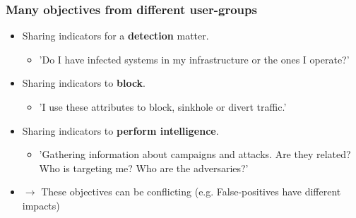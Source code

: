 \begin{frame}
\frametitle{Many objectives from different user-groups}
        \begin{itemize}
                \item Sharing indicators for a {\bf detection} matter.
                        \begin{itemize}
                                \item 'Do I have infected systems in my infrastructure or the ones I operate?'
                        \end{itemize}
                \item Sharing indicators to {\bf block}.
                        \begin{itemize}
                                \item 'I use these attributes to block, sinkhole or divert traffic.'
                        \end{itemize}
                \item Sharing indicators to {\bf perform intelligence}.
                        \begin{itemize}
                                \item 'Gathering information about campaigns and attacks. Are they related? Who is targeting me? Who are the adversaries?'
                        \end{itemize}
                \item $\rightarrow$ These objectives can be conflicting (e.g. False-positives have different impacts)
        \end{itemize}
\end{frame}

